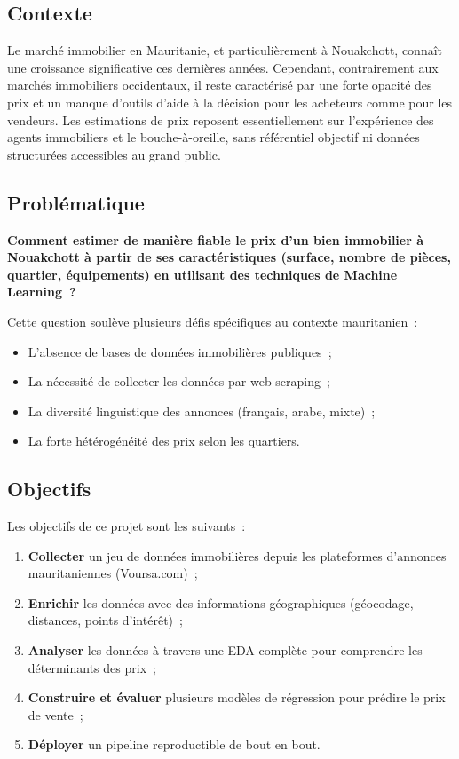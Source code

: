 \documentclass[12pt, a4paper]{article}
\begin{document}
\subsection{Contexte}

Le marché immobilier en Mauritanie, et particulièrement à Nouakchott, connaît une croissance significative ces dernières années. Cependant, contrairement aux marchés immobiliers occidentaux, il reste caractérisé par une forte opacité des prix et un manque d'outils d'aide à la décision pour les acheteurs comme pour les vendeurs. Les estimations de prix reposent essentiellement sur l'expérience des agents immobiliers et le bouche-à-oreille, sans référentiel objectif ni données structurées accessibles au grand public.

\subsection{Problématique}

\textbf{Comment estimer de manière fiable le prix d'un bien immobilier à Nouakchott à partir de ses caractéristiques (surface, nombre de pièces, quartier, équipements) en utilisant des techniques de Machine Learning~?}

Cette question soulève plusieurs défis spécifiques au contexte mauritanien~:
\begin{itemize}
    \item L'absence de bases de données immobilières publiques~;
    \item La nécessité de collecter les données par web scraping~;
    \item La diversité linguistique des annonces (français, arabe, mixte)~;
    \item La forte hétérogénéité des prix selon les quartiers.
\end{itemize}

\subsection{Objectifs}

Les objectifs de ce projet sont les suivants~:
\begin{enumerate}
    \item \textbf{Collecter} un jeu de données immobilières depuis les plateformes d'annonces mauritaniennes (Voursa.com)~;
    \item \textbf{Enrichir} les données avec des informations géographiques (géocodage, distances, points d'intérêt)~;
    \item \textbf{Analyser} les données à travers une EDA complète pour comprendre les déterminants des prix~;
    \item \textbf{Construire et évaluer} plusieurs modèles de régression pour prédire le prix de vente~;
    \item \textbf{Déployer} un pipeline reproductible de bout en bout.
\end{enumerate}
\end{document}
